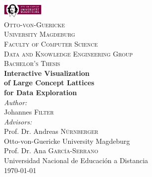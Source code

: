 \begin{titlepage}

\newcommand{\HRule}{\rule{\linewidth}{0.5mm}} %

\center %
 
\includegraphics[width=0.15\textwidth]{./images/logo}\\[0.5cm]

\textsc{\LARGE Otto-von-Guericke}\\[0.2cm] 
\textsc{\LARGE University Magdeburg}\\[0.5cm] 

\textsc{\large Faculty of Computer Science}\\[0.5cm]

\textsc{\normalsize Data and Knowledge Engineering Group}\\[1.5cm]

\textsc{\Large Bachelor's Thesis}\\[1.5cm] %

{ \huge \bfseries Interactive Visualization}\\[0.35cm]
{ \huge \bfseries of Large Concept Lattices}\\[0.2cm]
{ \huge \bfseries for Data Exploration}\\[1.5cm]
 

\Large \emph{Author:}\\
Johannes \textsc{Filter}\\[0.5cm]

\Large \emph{Advisors:}\\
Prof. Dr. Andreas \textsc{Nürnberger}\\
{\small Otto-von-Guericke University Magdeburg}\\[0.5cm]

Prof. Dr. Ana \textsc{García-Serrano}\\
{\small Universidad Nacional de Educación a Distancia}\\[1.0cm]


{\large \today}

\vfill %

\end{titlepage}